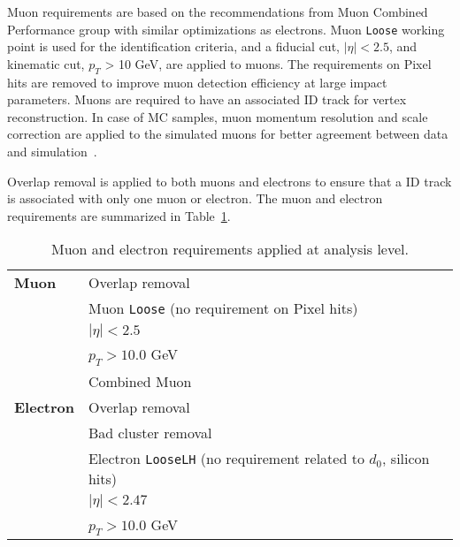 Muon requirements are based on the recommendations from Muon Combined Performance group with similar optimizations as electrons. Muon \texttt{Loose} working point is used for the identification criteria, and a fiducial cut, $|\eta| < 2.5$, and kinematic cut, $p_{T}$ > 10 GeV, are applied to muons. The requirements on Pixel hits are removed to improve muon detection efficiency at large impact parameters. Muons are required to have an associated ID track for vertex reconstruction. In case of MC samples, muon momentum resolution and scale correction are applied to the simulated muons for better agreement between data and simulation~\cite{Aad:2016jkr}.

Overlap removal is applied to both muons and electrons to ensure that a ID track is associated with only one muon or electron. The muon and electron requirements are summarized in Table~\ref{table:lepton_requirement}.

\begin{table}[!htb]
  \centering
  \begin{tabular}{ l  l }
    \hline
    \hline
    \textbf{Muon}     &       Overlap removal                                                                      \\
                                  &       Muon \texttt{Loose} (no requirement on Pixel hits)                       \\
                                  &       $|\eta| < 2.5$                                                           \\
                                  &       $p_{T} > 10.0$ GeV                                                       \\
                                  &       Combined Muon                                                            \\
    \hline
    \textbf{Electron} &       Overlap removal                                                                      \\
                                  &       Bad cluster removal                                                      \\
                                  &       Electron \texttt{LooseLH} (no requirement related to $d_{0}$, silicon hits)\\
                                  &       $|\eta| < 2.47$                                                          \\
                                  &       $p_{T} > 10.0$ GeV                                                       \\
    \hline
    \hline
  \end{tabular}
  \caption{Muon and electron requirements applied at analysis level.}
  \label{table:lepton_requirement}
\end{table}







